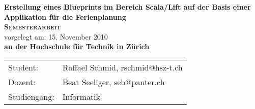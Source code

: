 \begin{titlepage}
    \begin{center}
    \huge \textbf{\textsf{Erstellung eines Blueprints im Bereich Scala/Lift auf der Basis einer Applikation f\"ur die Ferienplanung}} \\
    \vspace{2cm}
    \LARGE\textbf{\textsc{Semesterarbeit}}\\
    \vspace{1cm}
    \normalsize
    vorgelegt am: 15. November 2010 \\
    \vspace{2.5cm}
    \large \textbf{an der Hochschule f\"ur Technik in Z\"urich}\\
    \vspace{5cm}
    \end{center}
 \normalsize{
    \begin{tabular}{ll}
    	Student: &Raffael Schmid, rschmid@hsz-t.ch\\
     	Dozent: & Beat Seeliger, seb@panter.ch \\
    	Studiengang: & Informatik\\
    \end{tabular}\\
    }
\end{titlepage}